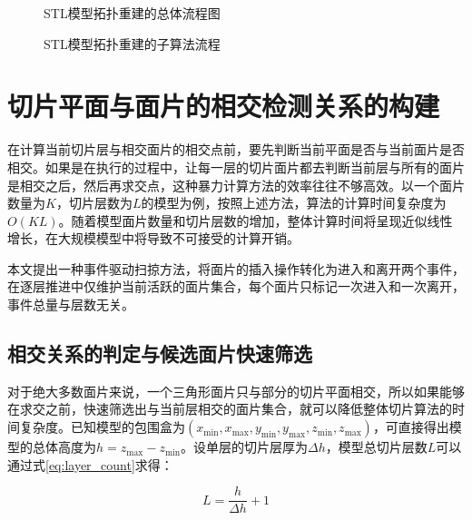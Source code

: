 \begin{figure}[htbp]
\centering
\caption{STL模型拓扑重建的总体流程图}
\label{fig:topo_flow}
\end{figure}

\begin{figure}[htbp]
\centering
\caption{STL模型拓扑重建的子算法流程}
\label{fig:topo_sub_algo}
\end{figure}

\section{切片平面与面片的相交检测关系的构建}\label{sec:eds}

在计算当前切片层与相交面片的相交点前，要先判断当前平面是否与当前面片是否相交。如果是在执行的过程中，让每一层的切片面片都去判断当前层与所有的面片是相交之后，然后再求交点，这种暴力计算方法的效率往往不够高效。以一个面片数量为$K$，切片层数为$L$的模型为例，按照上述方法，算法的计算时间复杂度为$O(KL)$。随着模型面片数量和切片层数的增加，整体计算时间将呈现近似线性增长，在大规模模型中将导致不可接受的计算开销。

本文提出一种事件驱动扫掠方法，将面片的插入操作转化为进入和离开两个事件，在逐层推进中仅维护当前活跃的面片集合，每个面片只标记一次进入和一次离开，事件总量与层数无关。

\subsection{相交关系的判定与候选面片快速筛选}

对于绝大多数面片来说，一个三角形面片只与部分的切片平面相交，所以如果能够在求交之前，快速筛选出与当前层相交的面片集合，就可以降低整体切片算法的时间复杂度。已知模型的包围盒为$(x_{\min},x_{\max},y_{\min},y_{\max},z_{\min},z_{\max})$，可直接得出模型的总体高度为$h=z_{\max}-z_{\min}$。设单层的切片层厚为$\Delta h$，模型总切片层数$L$可以通过式\eqref{eq:layer_count}求得：

\begin{equation}
L=\frac{h}{\Delta h}+1 \label{eq:layer_count}
\end{equation}

